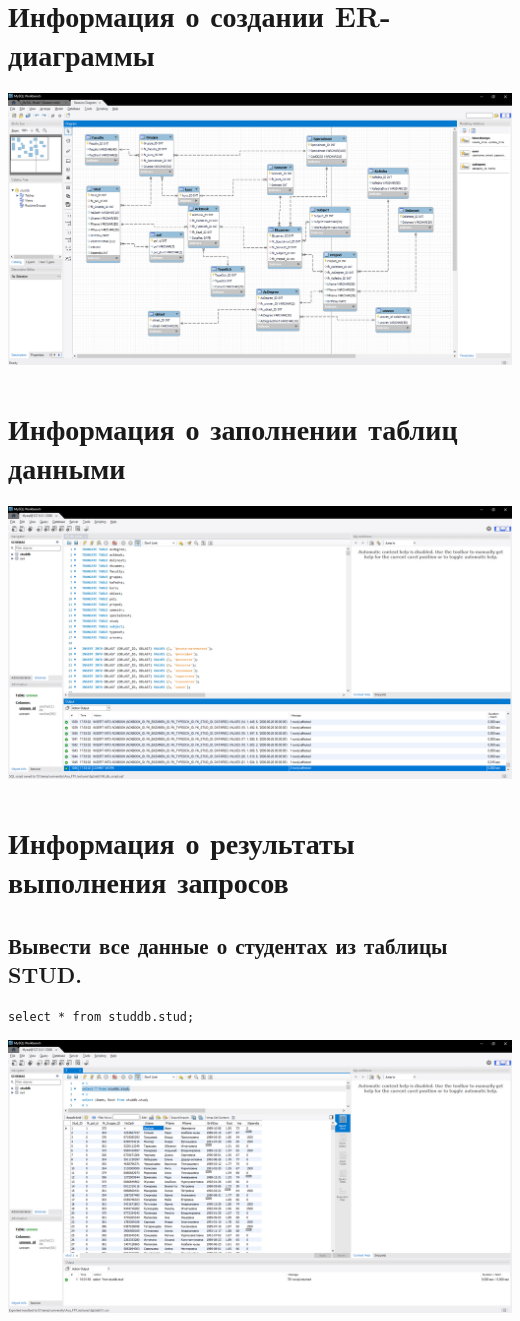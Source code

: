 \documentclass[a4paper, 12pt]{article}
\begin{document}
\section{Информация о создании ER-диаграммы}
\includegraphics[width=\textwidth]{3.png}

\section{Информация о заполнении таблиц данными}
\includegraphics[width=\textwidth]{4.png}

\section{Информация о результаты выполнения запросов}
\subsection{Вывести все данные о студентах из таблицы STUD.}
\begin{lstlisting}
select * from studdb.stud;  
\end{lstlisting}
\includegraphics[width=\textwidth]{5-1.png}
\end{document}
